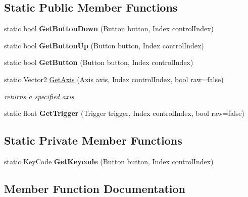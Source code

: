 \subsection*{Static Public Member Functions}
\begin{DoxyCompactItemize}
\item 
\mbox{\label{class_gamepad_input_1_1_game_pad_a0cd9e4a17e2e184da4bc8e6398452919}} 
static bool {\bfseries Get\+Button\+Down} (Button button, Index control\+Index)
\item 
\mbox{\label{class_gamepad_input_1_1_game_pad_a528588a558b40fe2d3f1d5ac9c75c0be}} 
static bool {\bfseries Get\+Button\+Up} (Button button, Index control\+Index)
\item 
\mbox{\label{class_gamepad_input_1_1_game_pad_a96bb3474234b5cfe6fa1b2ff5c5f4c9d}} 
static bool {\bfseries Get\+Button} (Button button, Index control\+Index)
\item 
static Vector2 \hyperlink{class_gamepad_input_1_1_game_pad_a13ac832d21112c8245f20f75120071dc}{Get\+Axis} (Axis axis, Index control\+Index, bool raw=false)
\begin{DoxyCompactList}\small\item\em returns a specified axis \end{DoxyCompactList}\item 
\mbox{\label{class_gamepad_input_1_1_game_pad_a82228971ea4da0fcf12ae44701be9e59}} 
static float {\bfseries Get\+Trigger} (Trigger trigger, Index control\+Index, bool raw=false)
\end{DoxyCompactItemize}
\subsection*{Static Private Member Functions}
\begin{DoxyCompactItemize}
\item 
\mbox{\label{class_gamepad_input_1_1_game_pad_ac661f23600571593d234a630864adf9d}} 
static Key\+Code {\bfseries Get\+Keycode} (Button button, Index control\+Index)
\end{DoxyCompactItemize}


\subsection{Member Function Documentation}
\mbox{\label{class_gamepad_input_1_1_game_pad_a13ac832d21112c8245f20f75120071dc}} 
